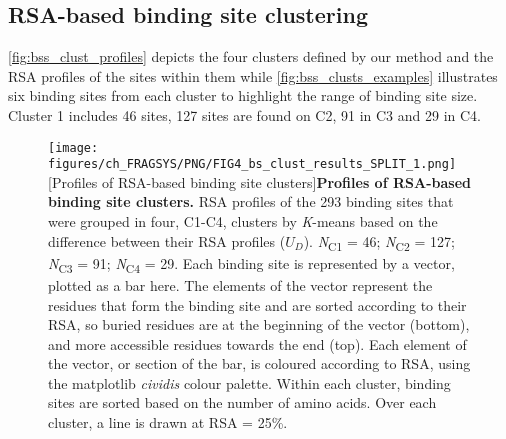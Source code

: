 
\subsection{RSA-based binding site clustering}

\autoref{fig:bss_clust_profiles} depicts the four clusters defined by our method and the RSA profiles of the sites within them while \autoref{fig:bss_clusts_examples} illustrates six binding sites from each cluster to highlight the range of binding site size. Cluster 1 includes 46 sites, 127 sites are found on C2, 91 in C3 and 29 in C4.

\begin{figure}[htb!]
    \centering
    \texttt{[image: figures/ch\_FRAGSYS/PNG/FIG4\_bs\_clust\_results\_SPLIT\_1.png]}
    [Profiles of RSA-based binding site clusters]{\textbf{Profiles of RSA-based binding site clusters.} RSA profiles of the 293 binding sites that were grouped in four, C1-C4, clusters by \textit{K}-means based on the difference between their RSA profiles ($U_{D}$). \textit{N}\textsubscript{C1} = 46; \textit{N}\textsubscript{C2} = 127; \textit{N}\textsubscript{C3} = 91; \textit{N}\textsubscript{C4} = 29. Each binding site is represented by a vector, plotted as a bar here. The elements of the vector represent the residues that form the binding site and are sorted according to their RSA, so buried residues are at the beginning of the vector (bottom), and more accessible residues towards the end (top). Each element of the vector, or section of the bar, is coloured according to RSA, using the matplotlib  \textit{cividis} colour palette. Within each cluster, binding sites are sorted based on the number of amino acids. Over each cluster, a line is drawn at RSA = 25\%.}
\label{fig:bss_clust_profiles}
\end{figure}


